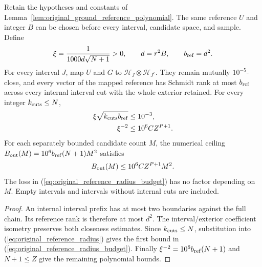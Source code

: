 \begin{corollary}
    \label{cor:original_ground_reference_trimming_profile}
    \leanok
    Retain the hypotheses and constants of
    Lemma~\ref{lem:original_ground_reference_polynomial}. The same
    reference $U$ and integer $B$ can be chosen before every interval,
    candidate space, and sample. Define
    \begin{align}
        \xi=\frac{1}{1000d\sqrt{N+1}}>0,
        \qquad d=r^2B,\qquad b_{\rm ref}=d^2.
        \label{eq:original_reference_radius}
    \end{align}
    For every interval $J$, map $U$ and $G$ to
    $\mathcal H_J\otimes\mathcal H_{J^c}$. They remain mutually
    $10^{-5}$-close, and every vector of the mapped reference has Schmidt
    rank at most $b_{\rm ref}$ across every internal interval cut with
    the whole exterior retained. For every integer $k_{\rm cuts}\le N$,
    \begin{align}
        \xi\sqrt{k_{\rm cuts}b_{\rm ref}} & \le10^{-3},\notag  \\
        \xi^{-2}                          & \le10^6 C Z^{P+1}.
        \label{eq:original_reference_radius_budget}
    \end{align}
    For each separately bounded candidate count $M$, the numerical
    ceiling $B_{\rm out}(M)=10^6b_{\rm ref}(N+1)M^2$ satisfies
    \begin{align}
        B_{\rm out}(M)\le10^6 C Z^{P+1}M^2.
        \label{eq:original_reference_output_profile}
    \end{align}
    The loss in (\ref{eq:original_reference_radius_budget}) has no factor
    depending on $M$. Empty intervals and intervals without internal
    cuts are included.
\end{corollary}
\begin{proof}\leanok
    An internal interval prefix has at most two boundaries against the
    full chain. Its reference rank is therefore at most $d^2$.
    The interval/exterior coefficient isometry preserves both closeness
    estimates. Since $k_{\rm cuts}\le N$, substitution into
    (\ref{eq:original_reference_radius}) gives the first bound in
    (\ref{eq:original_reference_radius_budget}). Finally
    $\xi^{-2}=10^6b_{\rm ref}(N+1)$ and $N+1\le Z$ give the remaining
    polynomial bounds.
\end{proof}
